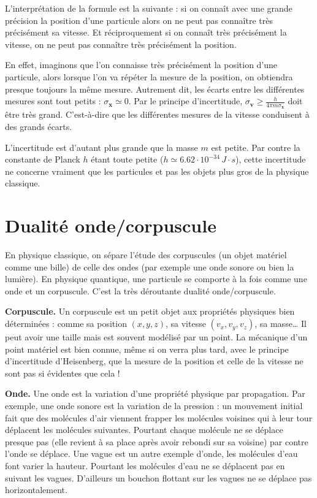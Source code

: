 \documentclass[11pt,class=report,crop=false]{standalone}
\begin{document}
L'interprétation de la formule est la suivante : si on connaît avec une grande précision la position d'une particule alors on ne peut pas connaître très précisément sa vitesse. Et réciproquement si on connaît très précisément la vitesse, on ne peut pas connaître très précisément la position. 

En effet, imaginons que l'on connaisse très précisément la position d'une particule,
alors lorsque l'on va répéter la mesure de la position, on obtiendra presque toujours la même mesure. Autrement dit, les écarts entre les différentes mesures sont tout petits : $\sigma_{\mathbf x} \simeq 0$. Par le principe d'incertitude,
$\sigma_{\mathbf v} \ge \frac{h}{4\pi m\sigma_{\mathbf x}}$
doit être très grand. C'est-à-dire que les différentes mesures de la vitesse conduisent à des grands écarts.

L'incertitude est d'autant plus grande que la masse $m$ est petite. Par contre la constante de Planck $h$ étant toute petite ($h \simeq 6.62 \cdot 10^{-34} \, J\cdot s$), cette incertitude ne concerne vraiment que les particules et pas les objets plus gros de la physique classique.


\section{Dualité onde/corpuscule}


En physique classique, on sépare l'étude des corpuscules (un objet matériel comme une bille) de celle des ondes (par exemple une onde sonore ou bien la lumière). En physique quantique, une particule se comporte à la fois comme une onde et un corpuscule. C'est la très déroutante \og{}dualité onde/corpuscule\fg{}.

\textbf{Corpuscule.} 
Un \og{}corpuscule\fg{} est un petit objet aux propriétés physiques bien déterminées : comme sa position $(x,y,z)$, sa vitesse $(v_x,v_y,v_z)$, sa masse\ldots{} Il peut avoir une taille mais est souvent modélisé par un point.
La mécanique d'un point matériel est bien connue, même si on verra plus tard, avec le principe d'incertitude d'Heisenberg, que la mesure de la position et celle de la vitesse ne sont pas si évidentes que cela !


\textbf{Onde.}
Une \og{}onde\fg{} est la variation d'une propriété physique par propagation. Par exemple, une onde sonore est la variation de la pression : un mouvement initial fait que des molécules d'air viennent frapper les molécules voisines qui à leur tour déplacent les molécules suivantes. Pourtant chaque molécule ne se déplace presque pas (elle revient à sa place après avoir rebondi sur sa voisine) par contre l'onde se déplace.
Une vague est un autre exemple d'onde, les molécules d'eau font varier la hauteur. Pourtant les molécules d'eau ne se déplacent pas en suivant les vagues. D'ailleurs un bouchon flottant sur les vagues ne se déplace pas horizontalement.
\end{document}
